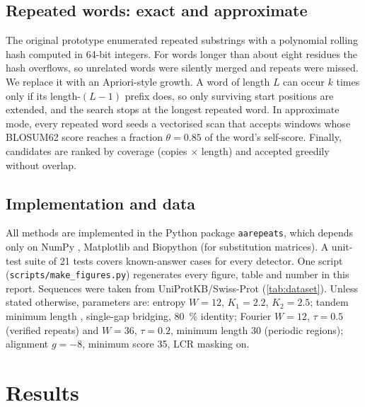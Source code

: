 \documentclass[11pt,a4paper]{article}
\newcommand{\code}[1]{\texttt{#1}}
\begin{document}
\subsection{Repeated words: exact and approximate}\label{sec:words}
The original prototype enumerated repeated substrings with a polynomial rolling hash \cite{karp1987rabin}
computed in 64-bit integers. For words longer than about eight residues the hash overflows, so unrelated words
were silently merged and repeats were missed. We replace it with an Apriori-style growth. A word of length $L$
can occur $k$ times only if its length-$(L-1)$ prefix does, so only surviving start positions are extended, and
the search stops at the longest repeated word. In approximate mode, every repeated word seeds a vectorised scan
that accepts windows whose BLOSUM62 score reaches a fraction $\theta=0.85$ of the word's self-score. Finally,
candidates are ranked by coverage (copies $\times$ length) and accepted greedily without overlap.

\subsection{Implementation and data}\label{sec:data}
All methods are implemented in the Python package \code{aarepeats}, which depends only on
NumPy \cite{harris2020numpy}, Matplotlib \cite{hunter2007matplotlib} and Biopython \cite{cock2009biopython}
(for substitution matrices). A unit-test suite of 21 tests covers known-answer cases for every
detector. One script (\code{scripts/make\_figures.py}) regenerates every figure, table and number in
this report. Sequences were taken from UniProtKB/Swiss-Prot \cite{uniprot2023} (\cref{tab:dataset}). Unless stated
otherwise, parameters are: entropy $W=12$, $K_1=2.2$, $K_2=2.5$; tandem minimum length \tandemMinLength{},
single-gap bridging, \SI{80}{\percent} identity; Fourier $W=12$, $\tau=0.5$ (verified repeats) and $W=36$,
$\tau=0.2$, minimum length 30 (periodic regions); alignment $g=-8$, minimum score 35, LCR masking on.

\begin{table}[tbp]
\centering
\caption{Proteins analysed. Each carries a well-documented repeat of a different class.}
\label{tab:dataset}
\small

\end{table}

\section{Results}\label{sec:results}
\end{document}
